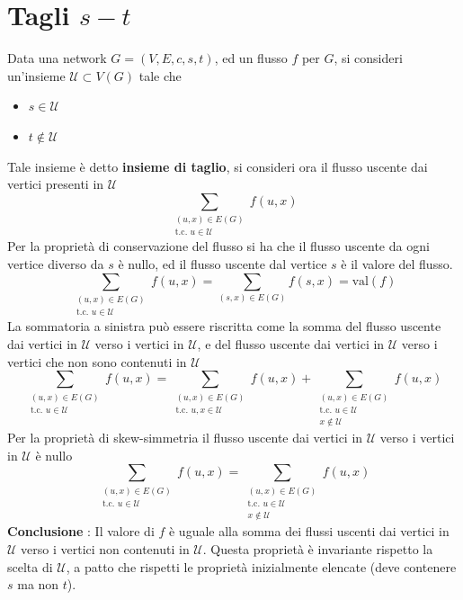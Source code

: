 \documentclass[10pt, letterpaper]{report}
\begin{document}
\section{Tagli $s-t$}
Data una network  $G=(V,E,c,s,t)$, ed un flusso $f$ per $G$, si consideri un'insieme $\mathcal U\subset V(G)$ tale che 
\begin{itemize}
    \item $s\in \mathcal U$
    \item $t\notin \mathcal U$
\end{itemize}
Tale insieme è detto \textbf{insieme di taglio}, si consideri ora il flusso uscente dai vertici presenti in $\mathcal U$
$$\sum_{\begin{matrix}
    (u,x)\in E(G)\\ \text{t.c. }u\in \mathcal U
\end{matrix}}f(u,x)$$
Per la proprietà di conservazione del flusso si ha che il flusso uscente da ogni vertice diverso da $s$ è nullo, ed il flusso uscente dal vertice $s$ è il valore del flusso.
$$\sum_{\begin{matrix}
    (u,x)\in E(G)\\ \text{t.c. }u\in \mathcal U
\end{matrix}}f(u,x)=\sum_{(s,x)\in E(G)}f(s,x)=\text{val}(f)$$
La sommatoria a sinistra può essere riscritta come la somma del flusso uscente dai vertici in $\mathcal U$ verso i vertici in $\mathcal U$, e del flusso uscente dai vertici in $\mathcal U$ verso i vertici che non sono contenuti in $\mathcal U$
$$ \sum_{\begin{matrix}
    (u,x)\in E(G)\\ \text{t.c. }u\in \mathcal U
\end{matrix}}f(u,x)=
\sum_{\begin{matrix}
    (u,x)\in E(G)\\ \text{t.c. }u,x\in \mathcal U
\end{matrix}}f(u,x)+\sum_{\begin{matrix}
    (u,x)\in E(G)\\ \text{t.c. }u\in \mathcal U\\ x\notin \mathcal U
\end{matrix}}f(u,x)$$
Per la proprietà di skew-simmetria il flusso uscente dai vertici in $\mathcal U$ verso i vertici in $\mathcal U$ è nullo 
$$ \sum_{\begin{matrix}
    (u,x)\in E(G)\\ \text{t.c. }u\in \mathcal U
\end{matrix}}f(u,x)=\sum_{\begin{matrix}
    (u,x)\in E(G)\\ \text{t.c. }u\in \mathcal U\\ x\notin \mathcal U
\end{matrix}}f(u,x)$$
\textbf{Conclusione} : Il valore di $f$ è uguale alla somma dei flussi uscenti dai vertici in $\mathcal U$ verso i vertici non contenuti in $\mathcal U$. Questa proprietà è invariante rispetto la scelta di $\mathcal U$, a patto che rispetti le proprietà inizialmente elencate (deve contenere $s$ ma non $t$). 
\end{document}
